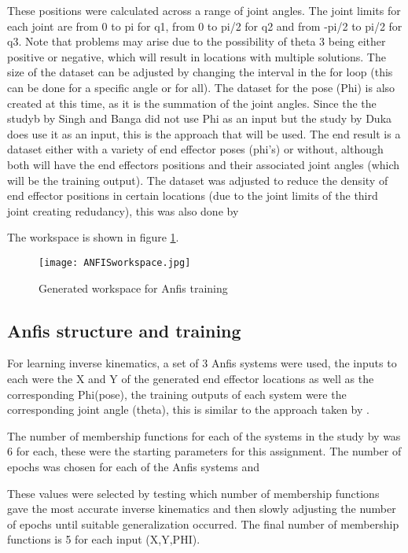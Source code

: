 \documentclass[a4paper,11pt]{article}
\begin{document}
These positions were calculated across a range of joint angles. The joint limits for each joint are from 0 to pi for q1, from 0 to pi/2 for q2 and from -pi/2 to pi/2 for q3. Note that problems may arise due to the possibility of theta 3 being either positive or negative, which will result in locations with multiple solutions. The size of the dataset can be adjusted by changing the interval in the for loop (this can be done for a specific angle or for all). The dataset for the pose (Phi) is also created at this time, as it is the summation of the joint angles. Since the the studyb by Singh and Banga did not use Phi as an input but the study by Duka does use it as an input, this is the approach that will be used.
The end result is a dataset either with a variety of end effector poses (phi’s) or without, although both will have the end effectors positions and their associated joint angles (which will be the training output). The dataset was adjusted to reduce the density of end effector positions in certain locations (due to the joint limits of the third joint creating redudancy), this was also done by %

The workspace is shown in figure \ref{fig:ANFISwork}.

\begin{figure}[H]
\centering
  \texttt{[image: ANFISworkspace.jpg]}
  \caption{Generated workspace for Anfis training}
\label{fig:ANFISwork}
\end{figure}


\subsection{Anfis structure and training}
For learning inverse kinematics, a set of 3 Anfis systems were used, the inputs to each were the X and Y of the generated end effector locations as well as the corresponding Phi(pose), the training outputs of each system were the corresponding joint angle (theta), this is similar to the approach taken by \cite{anfis1}.

The number of membership functions for each of the systems in the study by \cite{anfis2} was 6 for each, these were the starting parameters for this assignment. The number of epochs was chosen for each of the Anfis systems and %

These values were selected by testing which number of membership functions gave the most accurate inverse kinematics and then slowly adjusting the number of epochs until suitable generalization occurred. %
The final number of membership functions is 5 for each input (X,Y,PHI).
\end{document}
